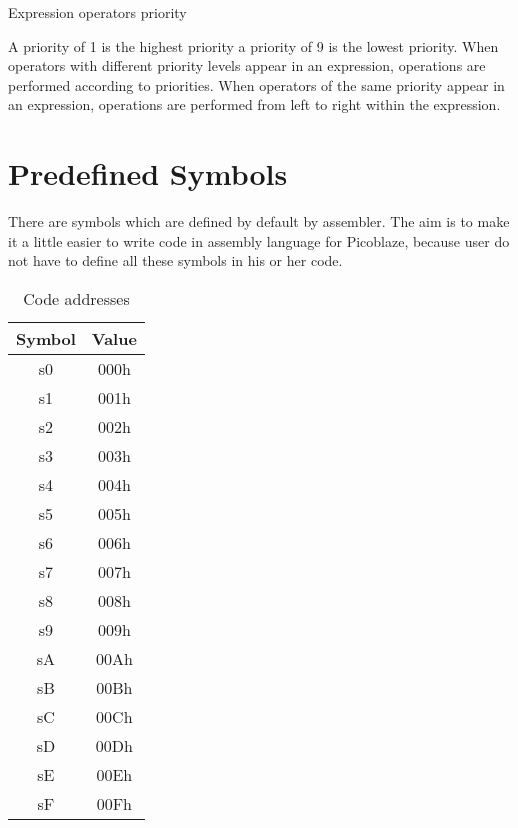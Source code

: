 \begin{table}[h!]
        \caption{Expression operators priority}
    \end{table}

    A priority of 1 is the highest priority a priority of 9 is the lowest priority. When operators with different priority levels appear in an expression, operations are performed according to priorities. When operators of the same priority appear in an expression, operations are performed from left to right within the expression.

\section{Predefined Symbols}
    There are symbols which are defined by default by assembler. The aim is to make it a little easier to write code in assembly language for Picoblaze, because user do not have to define all these symbols in his or her code.

    \begin{table}[h!]
        \centering{}
        \mysmallfont{}

        \begin{tabular}{|cc|}
            \hline
            Symbol & Value \\\hline
            s0     & 000h  \\\hline
            s1     & 001h  \\\hline
            s2     & 002h  \\\hline
            s3     & 003h  \\\hline
            s4     & 004h  \\\hline
            s5     & 005h  \\\hline
            s6     & 006h  \\\hline
            s7     & 007h  \\\hline
            s8     & 008h  \\\hline
            s9     & 009h  \\\hline
            sA     & 00Ah  \\\hline
            sB     & 00Bh  \\\hline
            sC     & 00Ch  \\\hline
            sD     & 00Dh  \\\hline
            sE     & 00Eh  \\\hline
            sF     & 00Fh  \\\hline
        \end{tabular}

        \caption{Code addresses}
    \end{table}

